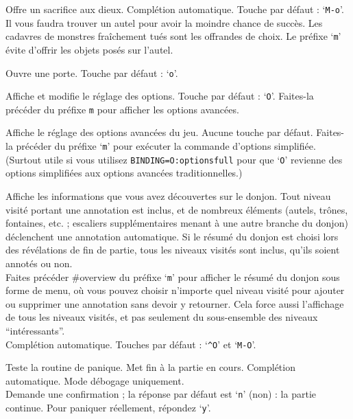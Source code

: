 \documentclass[titlepage]{article}
\begin{document}
\begin{description}[font=\mdseries\ttfamily]
Offre un sacrifice aux dieux. Complétion automatique. Touche par défaut : `\texttt{M-o}'.\\
Il vous faudra trouver un autel pour avoir la moindre chance de succès.
Les cadavres de monstres fraîchement tués sont les offrandes de choix.
Le préfixe `\texttt{m}' évite d'offrir les objets posés sur l'autel.\\
\item[\#open]
Ouvre une porte. Touche par défaut : `\texttt{o}'.
\item[\#options]
Affiche et modifie le réglage des options. Touche par défaut : `\texttt{O}'.
Faites-la précéder du préfixe \texttt{m} pour afficher les options avancées.
\item[\#optionsfull]
Affiche le réglage des options avancées du jeu.
Aucune touche par défaut.
Faites-la précéder du préfixe `\texttt{m}' pour exécuter la commande d'options simplifiée.
(Surtout utile si vous utilisez \texttt{BINDING=O:optionsfull} pour que
`\texttt{O}' revienne des options simplifiées aux options avancées traditionnelles.)
\item[\#overview]
Affiche les informations que vous avez découvertes sur le donjon.
Tout niveau visité
portant une annotation est inclus,
et de nombreux éléments (autels, trônes, fontaines, etc. ; escaliers supplémentaires
menant à une autre branche du donjon) déclenchent une annotation automatique.
Si le résumé du donjon est choisi lors des révélations de fin de partie, tous les
niveaux visités sont inclus, qu'ils soient annotés ou non.
\\
Faites précéder \#overview du préfixe `\texttt{m}' pour afficher le résumé
du donjon sous forme de menu, où vous pouvez choisir n'importe quel niveau visité
pour ajouter ou supprimer une annotation sans devoir y retourner.
Cela force aussi l'affichage de tous les niveaux visités, et pas seulement
du sous-ensemble des niveaux ``intéressants''.
\\
Complétion automatique.
Touches par défaut : `\texttt{\textasciicircum O}' et `\texttt{M-O}'.
\item[\#panic]
Teste la routine de panique.
Met fin à la partie en cours.
Complétion automatique.
Mode débogage uniquement.\\
Demande une confirmation ; la réponse par défaut est `\texttt{n}' (non) : la partie continue.
Pour paniquer réellement, répondez `\texttt{y}'.

\end{description}
\end{document}
